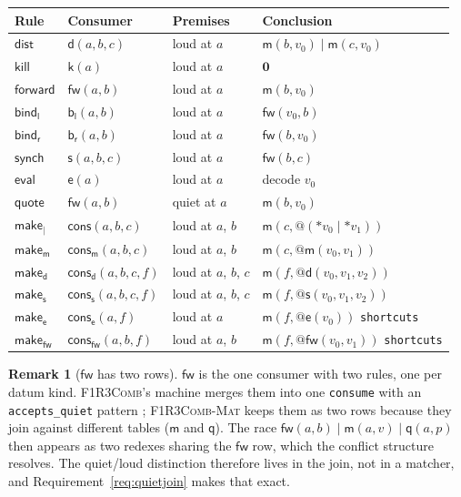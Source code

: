 \documentclass[11pt,a4paper]{article}
\makeatletter
\newcommand{\code}[1]{\texttt{#1}}
\newcommand{\Comb}{\textsc{F1R3Comb}}
\newcommand{\Mat}{\textsc{F1R3Comb-Mat}}
\newcommand{\quo}[1]{@#1}
\newcommand{\drp}[1]{{*}#1}
\newcommand{\nil}{\mathbf{0}}
\newcommand{\mm}{\mathsf{m}}
\newcommand{\dd}{\mathsf{d}}
\newcommand{\kk}{\mathsf{k}}
\newcommand{\fw}{\mathsf{fw}}
\newcommand{\bl}{\mathsf{b}_{\mathsf{l}}}
\newcommand{\br}{\mathsf{b}_{\mathsf{r}}}
\newcommand{\sy}{\mathsf{s}}
\newcommand{\ev}{\mathsf{e}}
\newcommand{\qq}{\mathsf{q}}
\newcommand{\cons}{\mathsf{cons}}
\newcommand{\consm}{\mathsf{cons}_{\mm}}
\newcommand{\consd}{\mathsf{cons}_{\dd}}
\newcommand{\conss}{\mathsf{cons}_{\sy}}
\newcommand{\conse}{\mathsf{cons}_{\ev}}
\newcommand{\consf}{\mathsf{cons}_{\fw}}
\theoremstyle{definition}
\newtheorem{remark}[definition]{Remark}
\theoremstyle{plain}
\makeatother
\begin{document}
\begin{center}\small
\begin{tabular}{@{}llll@{}}
\toprule
Rule & Consumer & Premises & Conclusion\\
\midrule
$\mathsf{dist}$ & $\dd(a,b,c)$ & loud at $a$ & $\mm(b,v_{0}) \mid \mm(c,v_{0})$\\
$\mathsf{kill}$ & $\kk(a)$ & loud at $a$ & $\nil$\\
$\mathsf{forward}$ & $\fw(a,b)$ & loud at $a$ & $\mm(b,v_{0})$\\
$\mathsf{bind_l}$ & $\bl(a,b)$ & loud at $a$ & $\fw(v_{0},b)$\\
$\mathsf{bind_r}$ & $\br(a,b)$ & loud at $a$ & $\fw(b,v_{0})$\\
$\mathsf{synch}$ & $\sy(a,b,c)$ & loud at $a$ & $\fw(b,c)$\\
$\mathsf{eval}$ & $\ev(a)$ & loud at $a$ & decode $v_{0}$\\
$\mathsf{quote}$ & $\fw(a,b)$ & quiet at $a$ & $\mm(b,v_{0})$\\
$\mathsf{make}_{\mid}$ & $\cons(a,b,c)$ & loud at $a$, $b$ & $\mm(c,\quo{(\drp{v_0}\mid\drp{v_1})})$\\
$\mathsf{make}_{\mm}$ & $\consm(a,b,c)$ & loud at $a$, $b$ & $\mm(c,\quo{\mm(v_0,v_1)})$\\
$\mathsf{make}_{\dd}$ & $\consd(a,b,c,f)$ & loud at $a$, $b$, $c$ & $\mm(f,\quo{\dd(v_0,v_1,v_2)})$\\
$\mathsf{make}_{\sy}$ & $\conss(a,b,c,f)$ & loud at $a$, $b$, $c$ & $\mm(f,\quo{\sy(v_0,v_1,v_2)})$\\
\midrule
$\mathsf{make}_{\ev}$ & $\conse(a,f)$ & loud at $a$ & $\mm(f,\quo{\ev(v_0)})$ \quad \code{shortcuts}\\
$\mathsf{make}_{\fw}$ & $\consf(a,b,f)$ & loud at $a$, $b$ & $\mm(f,\quo{\fw(v_0,v_1)})$ \quad \code{shortcuts}\\
\bottomrule
\end{tabular}
\end{center}

\begin{remark}[$\fw$ has two rows]
$\fw$ is the one consumer with two rules, one per datum kind. \Comb's machine
merges them into one \code{consume} with an \code{accepts\_quiet} pattern
\cite[\S8.2]{combspec}; \Mat{} keeps them as two rows because they join
against different tables ($\mm$ and $\qq$). The race
$\fw(a,b) \mid \mm(a,v) \mid \qq(a,p)$ \cite[Req.~8.6]{combspec} then appears
as two redexes sharing the $\fw$ row, which the conflict structure resolves.
The quiet/loud distinction therefore lives in the join, not in a matcher, and
Requirement~\ref{req:quietjoin} makes that exact.
\end{remark}
\end{document}
